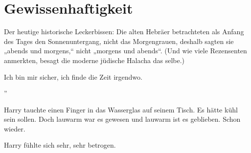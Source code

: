 \chapter{Gewissenhaftigkeit}

\begin{chapterOpeningAuthorNote}
% 
Der heutige historische Leckerbissen: Die alten Hebräer betrachteten als Anfang des Tages den Sonnenuntergang, nicht das Morgengrauen, deshalb sagten sie „abends und morgens,“ nicht „morgens und abends“. (Und wie viele Rezensenten anmerkten, besagt die moderne jüdische Halacha das selbe.)
\end{chapterOpeningAuthorNote}
\begin{chapterOpeningQuote}
Ich bin mir sicher, ich finde die Zeit irgendwo.
\end{chapterOpeningQuote}

”

\hplettrineextrapara
Harry tauchte einen Finger in das Wasserglas auf seinem Tisch. Es hätte kühl sein sollen. Doch lauwarm war es gewesen und lauwarm ist es geblieben. Schon wieder.

Harry fühlte sich sehr, sehr betrogen.

